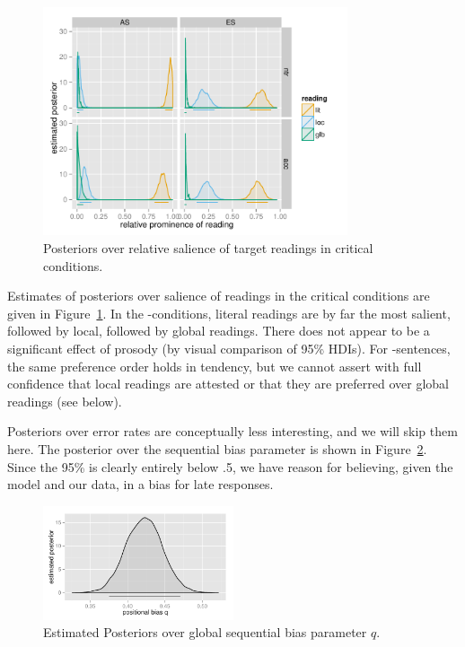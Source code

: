 \documentclass[fleqn,reqno,10pt]{article}
\newcommand{\as}{\acro{as}}
\renewcommand{\es}{\acro{es}}
\begin{document}
\begin{figure}
  \centering
  \includegraphics[width=0.8\textwidth]{pics/post_salience.pdf}
  \caption{Posteriors over relative salience of target readings in
    critical conditions.}
  \label{fig:Posterior_T}
\end{figure}

Estimates of posteriors over salience of readings in the critical
conditions are given in Figure~\ref{fig:Posterior_T}. In the
\es-conditions, literal readings are by far the most salient, followed
by local, followed by global readings. There does not appear to be a
significant effect of prosody (by visual comparison of 95\%
HDIs). For \as-sentences, the same preference order holds in tendency,
but we cannot assert with full confidence that local readings are
attested or that they are preferred over global readings (see below).
 
Posteriors over error rates are conceptually less interesting, and we
will skip them here. The posterior over the sequential bias parameter
is shown in Figure~\ref{fig:post_q}. Since the 95\% is clearly
entirely below .5, we have reason for believing, given the model and
our data, in a bias for late responses.

\begin{figure}
  \centering
  \includegraphics[width=0.5\textwidth]{pics/post_q.pdf}
  \caption{Estimated Posteriors over global sequential bias parameter
    $q$.}
  \label{fig:post_q}
\end{figure}
\end{document}
